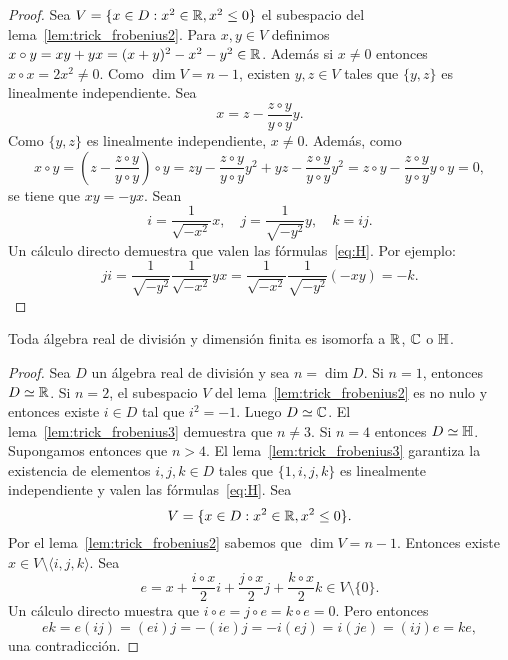 \begin{proof}
	Sea $V=\{x\in D:x^2\in\mathbb{R},x^2\leq 0\}$ el subespacio del
	lema~\ref{lem:trick_frobenius2}.  Para $x,y\in V$ definimos $x\circ
	y=xy+yx=(x+y)^2-x^2-y^2\in\mathbb{R}$. Además si $x\ne0$ entonces $x\circ
	x=2x^2\ne0$. Como $\dim V=n-1$, existen $y,z\in V$ tales que $\{y,z\}$ es
	linealmente independiente. Sea 
	\[
		x=z-\frac{z\circ y}{y\circ y}y.
	\]
	Como $\{y,z\}$ es linealmente independiente, $x\ne0$. Además, como 
	\[
		x\circ y
		=\left(z-\frac{z\circ y}{y\circ y}\right)\circ y
		=zy-\frac{z\circ y}{y\circ y}y^2+yz-\frac{z\circ y}{y\circ y}y^2
		=z\circ y-\frac{z\circ y}{y\circ y}y\circ y=0,
	\]
	se tiene que $xy=-yx$. 
	Sean 
	\[
		i=\frac{1}{\sqrt{-x^2}}x,
		\quad
		j=\frac{1}{\sqrt{-y^2}}y,
		\quad
		k=ij. 
	\]
	Un cálculo directo demuestra que valen las fórmulas~\eqref{eq:H}. Por ejemplo:
	\[
		ji=\frac{1}{\sqrt{-y^2}}\frac{1}{\sqrt{-x^2}}yx=\frac{1}{\sqrt{-x^2}}\frac{1}{\sqrt{-y^2}}(-xy)=-k.
	\]
\end{proof}

\begin{theorem}[Frobenius]
	\label{thm:Frobenius}
	Toda álgebra real de división y dimensión finita es isomorfa a $\mathbb{R}$, $\mathbb{C}$ o
	$\mathbb{H}$.
\end{theorem}

\begin{proof}
	Sea $D$ un álgebra real de división y sea $n=\dim D$. Si $n=1$, entonces
	$D\simeq\mathbb{R}$. Si $n=2$, el subespacio $V$ del
	lema~\ref{lem:trick_frobenius2} es no nulo y entonces existe $i\in D$ tal
	que $i^2=-1$. Luego $D\simeq\mathbb{C}$. El lema~\ref{lem:trick_frobenius3}
	demuestra que $n\ne3$. Si $n=4$ entonces $D\simeq\mathbb{H}$. Supongamos entonces
	que $n>4$.  El lema~\ref{lem:trick_frobenius3} garantiza la existencia de
	elementos $i,j,k\in D$ tales que $\{1,i,j,k\}$ es linealmente independiente
	y valen las fórmulas~\eqref{eq:H}. Sea 
	\[
		V=\{x\in D:x^2\in\mathbb{R},x^2\leq 0\}.
	\]
	Por el lema~\ref{lem:trick_frobenius2} sabemos que $\dim V=n-1$. Entonces
	existe $x\in V\setminus\langle i,j,k\rangle$. Sea
	\[
		e=x+\frac{i\circ x}{2}i+\frac{j\circ x}{2}j+\frac{k\circ x}{2}k\in V\setminus\{0\}.
	\]
	Un cálculo directo muestra que $i\circ e=j\circ e=k\circ e=0$. Pero entonces 
	\[
		ek=e(ij)=(ei)j=-(ie)j=-i(ej)=i(je)=(ij)e=ke,
	\]
	una contradicción. 
\end{proof}


